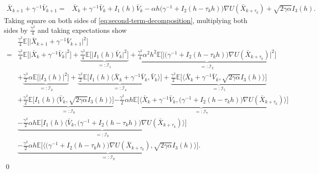 \documentclass[12pt]{article}
\numberwithin{equation}{section}
\renewenvironment{proof}%
  {\begin{trivlist}%
   \item[]\ignorespaces}%
  {\qed\end{trivlist}}
\begin{document}
\begin{proof}
\begin{equation}
\begin{aligned}
\bar{X}_{k+1}
+
\gamma^{-1}\bar{V}_{k+1}
=&
\bar{X}_k
+
\gamma^{-1}\bar{V}_k
+
I_{1} (h)
\bar{V}_k
-
\alpha h
\big(
\gamma^{-1}
+
I_{2} (h-\tau_kh)
\big)
\nabla U(\bar{X}_{k+\tau_k})
+
\sqrt{2\gamma\alpha}
I_{3} (h).
\end{aligned}
\end{equation}
Taking square on both sides of \eqref{eq:second-term-decomposition}, multiplying both sides by $\frac{\gamma^2}{4}$ and taking expectations show
\begin{equation}
\label{eq:second-term-square}
\begin{aligned}
&
\tfrac{\gamma^2}{4}\mathbb{E}
\Big[
\big|
\bar{X}_{k+1}
+
\gamma^{-1}\bar{V}_{k+1}
\big|^2
\Big]
\\ 
=&
\tfrac{\gamma^2}{4}
\mathbb{E}
\Big[
\big|
\bar{X}_k
+
\gamma^{-1}\bar{V}_k
\big|^2
\Big]
+
\underbrace{
\tfrac{\gamma^2}{4}
\mathbb{E}
\Big[
\big|
I_1(h)\bar{V}_k
\big|^2
\Big]
}_{=:\mathcal{I}_1}
+
\underbrace{
\tfrac{\gamma^2}{4}
\alpha^2h^2
\mathbb{E}
\Big[
\big|
\big(
\gamma^{-1}
+
I_{2} (h-\tau_kh)
\big)
\nabla U(\bar{X}_{k+\tau_k})
\big|^2
\Big]
}_{=:\mathcal{I}_2}
\\   &
+
\underbrace{
\tfrac{\gamma^3}{2}
\alpha
\mathbb{E}
\Big[
\big|
I_3(h)
\big|^2
\Big]
}_{=:\mathcal{I}_3}
+
\underbrace{
\tfrac{\gamma^2}{2}
\mathbb{E}
\Big[
I_1(h)
\big\langle
\bar{X}_k
+
\gamma^{-1}\bar{V}_k,
\bar{V}_k
\big\rangle
\Big]
}_{=:\mathcal{I}_4}
+
\underbrace{
\tfrac{\gamma^2}{2}
\mathbb{E}
\Big[
\Big\langle
\bar{X}_k
+
\gamma^{-1}\bar{V}_k,
\sqrt{2\gamma\alpha}
I_3(h)
\Big\rangle
\Big]
}_{=:\mathcal{I}_5}
\\
&
+
\underbrace{
\tfrac{\gamma^2}{2}
\mathbb{E}
\Big[
I_1(h)
\big\langle
\bar{V}_k,
\sqrt{2\gamma\alpha}
I_3(h)
\big\rangle
\Big]
}_{=:\mathcal{I}_6}
\underbrace{
-
\tfrac{\gamma^2}{2}
\alpha  h
\mathbb{E}
\Big[
\Big\langle
\bar{X}_k
+
\gamma^{-1}\bar{V}_k,
\big(
\gamma^{-1}
+
I_{2} (h-\tau_kh)
\big)
\nabla U(\bar{X}_{k+\tau_k})
\Big\rangle
\Big]
}_{=:\mathcal{I}_7}
\\   &
\underbrace{
-
\tfrac{\gamma^2}{2}
\alpha  h
\mathbb{E}
\Big[
I_1(h)
\Big\langle
\bar{V}_k,
\big(
\gamma^{-1}
+
I_{2} (h-\tau_kh)
\big)
\nabla U(\bar{X}_{k+\tau_k})
\Big\rangle
\Big]
}_{=:\mathcal{I}_8}
\\ &
\underbrace{
-
\tfrac{\gamma^2}{2}
\alpha h
\mathbb{E}
\Big[
\big\langle
\big(
\gamma^{-1}
+
I_{2} (h-\tau_kh)
\big)
\nabla U(\bar{X}_{k+\tau_k}),
\sqrt{2\gamma\alpha}
I_3(h)
\big\rangle
\Big]
}_{=:\mathcal{I}_9}
.
\end{aligned}

\end{equation}
\end{proof}
\end{document}
